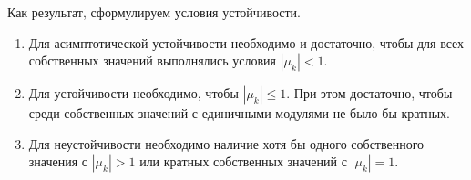 Как результат, сформулируем условия устойчивости.
\begin{enumerate}
    \item Для асимптотической устойчивости необходимо и достаточно, чтобы для всех собственных значений выполнялись
    условия $\displaystyle |\mu_k| < 1$.

    \item Для устойчивости необходимо, чтобы $\displaystyle |\mu_k| \leq 1$. При этом достаточно, чтобы среди собственных
    значений с единичными модулями не было бы кратных.

    \item Для неустойчивости необходимо наличие хотя бы одного собственного значения с $\displaystyle |\mu_k| > 1$ или
    кратных собственных значений с $\displaystyle |\mu_k| = 1$.
\end{enumerate}
